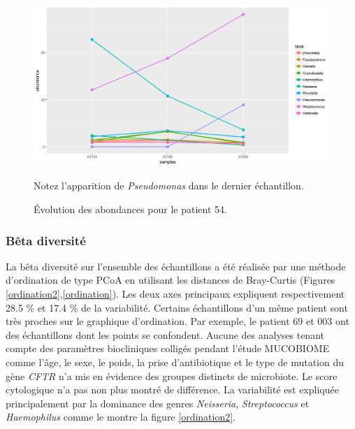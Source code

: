 \documentclass[12pt,a4paper]{article}
\begin{document}
\begin{figure}
\begin{center}
\includegraphics[scale=0.60]{img/curve_054.png}\hfill
\end{center}
\caption{Évolution des abondances pour le patient 54.}
Notez l'apparition de \textit{Pseudomonas} dans le dernier échantillon.
\label{evolution54}
\end{figure}

\subsubsection{Bêta diversité}
La bêta diversité sur l’ensemble des échantillons a été réalisée par une méthode d’ordination de type PCoA en utilisant les distances de Bray-Curtis (Figures \ref{ordination2},\ref{ordination}).
Les deux axes principaux expliquent respectivement 28.5 \% et 17.4 \% de la variabilité.
Certains échantillons d’un même patient sont très proches sur le graphique d’ordination. Par exemple, le patient 69 et 003 ont des échantillons dont les points se confondent.
Aucune des analyses tenant compte des paramètres biocliniques colligés pendant l'étude MUCOBIOME comme l'âge, le sexe, le poids, la prise d'antibiotique et le type de mutation du gène \textit{CFTR} n’a mis en évidence des groupes distincts de microbiote. Le score cytologique n'a pas non plus montré de différence.
La variabilité est expliquée principalement par la dominance des genres \textit{Neisseria}, \textit{Streptococcus} et \textit{Haemophilus} comme le montre la figure \ref{ordination2}.
\end{document}

